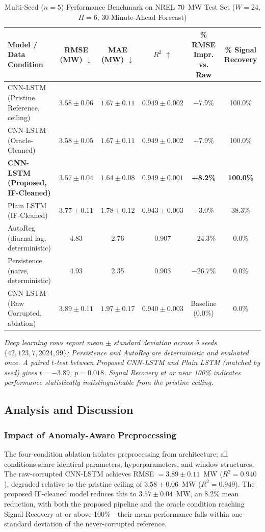 \documentclass[conference]{IEEEtran}
\begin{document}
\begin{table}[!t]
\centering
\caption{Multi-Seed ($n=5$) Performance Benchmark on NREL 70~MW Test Set ($W{=}24$, $H{=}6$, 30-Minute-Ahead Forecast)}
\label{tab:results}
\begin{tabular}{@{}lccccc@{}}
\toprule
\textbf{Model / Data Condition} & \textbf{RMSE (MW) $\downarrow$} & \textbf{MAE (MW) $\downarrow$} & \textbf{$R^2$ $\uparrow$} & \textbf{\% RMSE Impr. vs. Raw} & \textbf{\% Signal Recovery} \\
\midrule
CNN-LSTM (Pristine Reference, ceiling) & $3.58 \pm 0.06$ & $1.67 \pm 0.11$ & $0.949 \pm 0.002$ & +7.9\% & 100.0\% \\
CNN-LSTM (Oracle-Cleaned)              & $3.58 \pm 0.05$ & $1.67 \pm 0.11$ & $0.949 \pm 0.002$ & +7.9\% & 100.0\% \\
\textbf{CNN-LSTM (Proposed, IF-Cleaned)} & $\mathbf{3.57 \pm 0.04}$ & $\mathbf{1.64 \pm 0.08}$ & $\mathbf{0.949 \pm 0.001}$ & \textbf{+8.2\%} & \textbf{100.0\%} \\
Plain LSTM (IF-Cleaned)                & $3.77 \pm 0.11$ & $1.78 \pm 0.12$ & $0.943 \pm 0.003$ & +3.0\% & 38.3\% \\
AutoReg (diurnal lag, deterministic)   & 4.83 & 2.76 & 0.907 & $-$24.3\% & 0.0\% \\
Persistence (naive, deterministic)     & 4.93 & 2.35 & 0.903 & $-$26.7\% & 0.0\% \\
CNN-LSTM (Raw Corrupted, ablation)     & $3.89 \pm 0.11$ & $1.97 \pm 0.17$ & $0.940 \pm 0.003$ & Baseline (0.0\%) & 0.0\% \\
\bottomrule
\end{tabular}

\vspace{3pt}
\footnotesize{\textit{Deep learning rows report mean $\pm$ standard deviation across 5 seeds $\{42, 123, 7, 2024, 99\}$; Persistence and AutoReg are deterministic and evaluated once. A paired $t$-test between Proposed CNN-LSTM and Plain LSTM (matched by seed) gives $t=-3.89$, $p=0.018$. Signal Recovery at or near 100\% indicates performance statistically indistinguishable from the pristine ceiling.}}
\end{table}

\subsection{Analysis and Discussion}

\subsubsection{Impact of Anomaly-Aware Preprocessing}
The four-condition ablation isolates preprocessing from architecture; all conditions share identical parameters, hyperparameters, and window structures. The raw-corrupted CNN-LSTM achieves RMSE $=3.89 \pm 0.11$~MW ($R^2 = 0.940$), degraded relative to the pristine ceiling of $3.58 \pm 0.06$~MW ($R^2 = 0.949$). The proposed IF-cleaned model reduces this to $3.57 \pm 0.04$~MW, an 8.2\% mean reduction, with both the proposed pipeline and the oracle condition reaching Signal Recovery at or above 100\%---their mean performance falls within one standard deviation of the never-corrupted reference.
\end{document}
